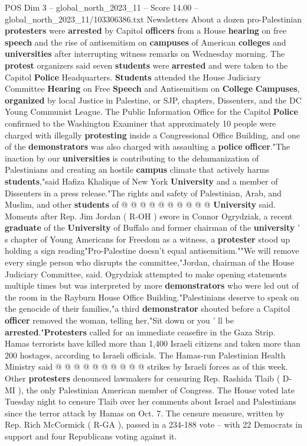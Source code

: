 \begin{textsample}{POS Dim 3 – global\_north\_2023\_11 – Score 14.00 – global\_north\_2023\_11/103306386.txt}  \label{ex:f3_pos_183}
Newsletters About a dozen pro-Palestinian \textbf{protesters} were \textbf{arrested} by Capitol \textbf{officers} from a House \textbf{hearing} on free \textbf{speech} and the rise of antisemitism on \textbf{campuses} of American \textbf{colleges} and \textbf{universities} after interrupting witness remarks on Wednesday morning.
The \textbf{protest} organizers said seven \textbf{students} were \textbf{arrested} and were taken to the Capitol \textbf{Police} Headquarters. \textbf{Students} attended the House Judiciary Committee \textbf{Hearing} on Free \textbf{Speech} and Antisemitism on \textbf{College} \textbf{Campuses}, \textbf{organized} by local Justice in Palestine, or SJP, chapters, Dissenters, and the DC Young Communist League.
The Public Information Office for the Capitol \textbf{Police} confirmed to the Washington Examiner that approximately 10 people were charged with illegally \textbf{protesting} inside a Congressional Office Building, and one of the \textbf{demonstrators} was also charged with assaulting a \textbf{police} \textbf{officer}."The inaction by our \textbf{universities} is contributing to the dehumanization of Palestinians and creating an hostile \textbf{campus} climate that actively harms \textbf{students},"said Hafiza Khalique of New York \textbf{University} and a member of Dissenters in a press release."The rights and safety of Palestinian, Arab, and Muslim, and other \textbf{students} of @ @ @ @ @ @ @ @ @ @ \textbf{University} said.
Moments after Rep.
Jim Jordan ( R-OH ) swore in Connor Ogrydziak, a recent \textbf{graduate} of the \textbf{University} of Buffalo and former chairman of the \textbf{university} ' s chapter of Young Americans for Freedom as a witness, a \textbf{protester} stood up holding a sign reading"Pro-Palestine doesn't equal antisemitism.""We will remove every single person who disrupts the committee,"Jordan, chairman of the House Judiciary Committee, said.
Ogrydziak attempted to make opening statements multiple times but was interpreted by more \textbf{demonstrators} who were led out of the room in the Rayburn House Office Building."Palestinians deserve to speak on the genocide of their families,"a third \textbf{demonstrator} shouted before a Capitol \textbf{officer} removed the woman, telling her,"Sit down or you ' ll be \textbf{arrested}."\textbf{Protesters} called for an immediate ceasefire in the Gaza Strip.
Hamas terrorists have killed more than 1,400 Israeli citizens and taken more than 200 hostages, according to Israeli officials.
The Hamas-run Palestinian Health Ministry said @ @ @ @ @ @ @ @ @ @ strikes by Israeli forces as of this week.
Other \textbf{protesters} denounced lawmakers for censuring Rep.
Rashida Tlaib ( D-MI ), the only Palestinian American member of Congress.
The House voted late Tuesday night to censure Tlaib over her comments about Israel and Palestinians since the terror attack by Hamas on Oct. 7.
The censure measure, written by Rep.
Rich McCormick ( R-GA ), passed in a 234-188 vote -- with 22 Democrats in support and four Republicans voting against it.


\end{textsample}
